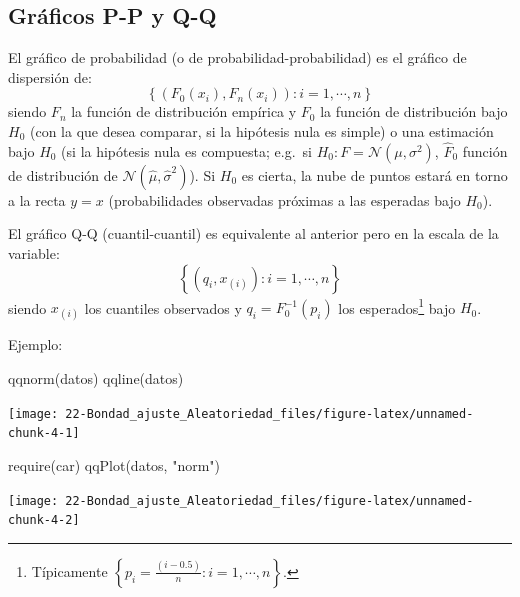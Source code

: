 \documentclass[
]{book}
\newenvironment{Shaded}{\begin{snugshade}}{\end{snugshade}}
\newcommand{\FunctionTok}[1]{\textcolor[rgb]{0.00,0.00,0.00}{#1}}
\newcommand{\NormalTok}[1]{#1}
\newcommand{\StringTok}[1]{\textcolor[rgb]{0.31,0.60,0.02}{#1}}
\theoremstyle{break}
\theoremstyle{nonumberplain}
\begin{document}
\hypertarget{gruxe1ficos-p-p-y-q-q}{%
\subsection{Gráficos P-P y Q-Q}\label{gruxe1ficos-p-p-y-q-q}}

El gráfico de probabilidad (o de probabilidad-probabilidad) es el gráfico de dispersión de:
\[\left \{  \left( F_0(x_{i}), F_n(x_{i}) \right)  :i=1,\cdots,n\right \}\]
siendo \(F_n\) la función de distribución empírica y \(F_0\) la función de distribución bajo \(H_0\) (con la que desea comparar, si la hipótesis nula es simple) o una estimación bajo \(H_0\) (si la hipótesis nula es compuesta; e.g.~si \(H_0:F= \mathcal{N}(\mu,\sigma^2)\),
\(\hat{F}_0\) función de distribución de \(\mathcal{N}(\hat{\mu},\hat{\sigma}^2)\)).
Si \(H_0\) es cierta, la nube de puntos estará en torno a la recta \(y=x\) (probabilidades observadas próximas a las esperadas bajo \(H_0\)).

El gráfico Q-Q (cuantil-cuantil) es equivalente al anterior pero en la escala de la variable:
\[\left\{ \left( q_{i}, x_{(i)}\right) : i=1, \cdots, n \right\}\]
siendo \(x_{(i)}\) los cuantiles observados y \(q_{i}=F_0^{-1}(p_{i})\) los esperados\footnote{Típicamente \(\left \{ p_{i}=\frac{\left(i-0.5 \right)}n : i=1, \cdots, n \right\}\).} bajo \(H_0\).

Ejemplo:

\begin{Shaded}
\begin{Highlighting}[]
\FunctionTok{qqnorm}\NormalTok{(datos)}
\FunctionTok{qqline}\NormalTok{(datos)}
\end{Highlighting}
\end{Shaded}

\begin{center}\texttt{[image: 22-Bondad\_ajuste\_Aleatoriedad\_files/figure-latex/unnamed-chunk-4-1]} \end{center}

\begin{Shaded}
\begin{Highlighting}[]
\FunctionTok{require}\NormalTok{(car)}
\FunctionTok{qqPlot}\NormalTok{(datos, }\StringTok{"norm"}\NormalTok{)}
\end{Highlighting}
\end{Shaded}

\begin{center}\texttt{[image: 22-Bondad\_ajuste\_Aleatoriedad\_files/figure-latex/unnamed-chunk-4-2]} \end{center}
\end{document}
